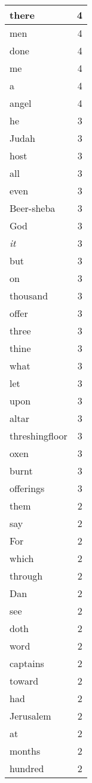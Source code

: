 \begin{center}
\begin{longtable}{l|r}
there & 4 \\ \hline
men & 4 \\ \hline
done & 4 \\ \hline
me & 4 \\ \hline
a & 4 \\ \hline
angel & 4 \\ \hline
he & 3 \\ \hline
Judah & 3 \\ \hline
host & 3 \\ \hline
all & 3 \\ \hline
even & 3 \\ \hline
Beer-sheba & 3 \\ \hline
God & 3 \\ \hline
\emph{it} & 3 \\ \hline
but & 3 \\ \hline
on & 3 \\ \hline
thousand & 3 \\ \hline
offer & 3 \\ \hline
three & 3 \\ \hline
thine & 3 \\ \hline
what & 3 \\ \hline
let & 3 \\ \hline
upon & 3 \\ \hline
altar & 3 \\ \hline
threshingfloor & 3 \\ \hline
oxen & 3 \\ \hline
burnt & 3 \\ \hline
offerings & 3 \\ \hline
them & 2 \\ \hline
say & 2 \\ \hline
For & 2 \\ \hline
which & 2 \\ \hline
through & 2 \\ \hline
Dan & 2 \\ \hline
see & 2 \\ \hline
doth & 2 \\ \hline
word & 2 \\ \hline
captains & 2 \\ \hline
toward & 2 \\ \hline
had & 2 \\ \hline
Jerusalem & 2 \\ \hline
at & 2 \\ \hline
months & 2 \\ \hline
hundred & 2 \\ \hline

\end{longtable}
\end{center}
